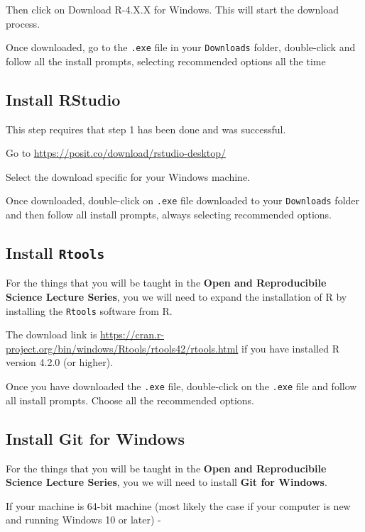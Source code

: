 \documentclass[
  12pt,
]{book}
\begin{document}
Then click on Download R-4.X.X for Windows. This will start the download process.

Once downloaded, go to the \texttt{.exe} file in your \texttt{Downloads} folder, double-click and follow all the install prompts, selecting recommended options all the time

\hypertarget{install-rstudio}{%
\subsection{Install RStudio}\label{install-rstudio}}

This step requires that step 1 has been done and was successful.

Go to \url{https://posit.co/download/rstudio-desktop/}

Select the download specific for your Windows machine.

Once downloaded, double-click on \texttt{.exe} file downloaded to your \texttt{Downloads} folder and then follow all install prompts, always selecting recommended options.

\hypertarget{install-rtools}{%
\subsection{\texorpdfstring{Install \texttt{Rtools}}{Install Rtools}}\label{install-rtools}}

For the things that you will be taught in the \textbf{Open and Reproducibile Science Lecture Series}, you we will need to expand the installation of R by installing the \texttt{Rtools} software from R.

The download link is \url{https://cran.r-project.org/bin/windows/Rtools/rtools42/rtools.html} if you have installed R version 4.2.0 (or higher).

Once you have downloaded the \texttt{.exe} file, double-click on the \texttt{.exe} file and follow all install prompts. Choose all the recommended options.

\hypertarget{install-git-for-windows}{%
\subsection{Install Git for Windows}\label{install-git-for-windows}}

For the things that you will be taught in the \textbf{Open and Reproducibile Science Lecture Series}, you we will need to install \textbf{Git for Windows}.

If your machine is 64-bit machine (most likely the case if your computer is new and running Windows 10 or later) -
\end{document}
